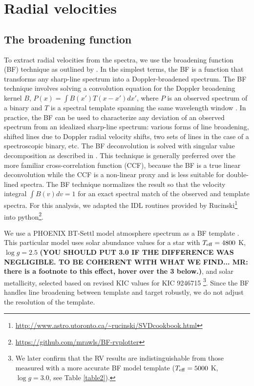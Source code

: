 \section{Radial velocities}\label{rvs}
\subsection{The broadening function}\label{bf}
To extract radial velocities from the spectra, we use the broadening function (BF) technique as outlined by \citet{ruc02}. In the simplest terms, the BF is a function that transforms any sharp-line spectrum into a Doppler-broadened spectrum. The BF technique involves solving a convolution equation for the Doppler broadening kernel $B$, $P(x) = \int B(x') T(x - x') dx'$, where $P$ is an observed spectrum of a binary and $T$ is a spectral template spanning the same wavelength window \citep{ruc14}. In practice, the BF can be used to characterize any deviation of an observed spectrum from an idealized sharp-line spectrum: various forms of line broadening, shifted lines due to Doppler radial velocity shifts, two sets of lines in the case of a spectroscopic binary, etc. The BF deconvolution is solved with singular value decomposition as described in \citet{ruc02}. This technique is generally preferred over the more familiar cross-correlation function (CCF), because the BF is a true linear deconvolution while the CCF is a non-linear proxy and is less suitable for double-lined spectra. The BF technique normalizes the result so that the velocity integral $\int B(v) dv = 1$ for an exact spectral match of the observed and template spectra. For this analysis, we adapted the IDL routines provided by Rucinski\footnote{\url{http://www.astro.utoronto.ca/~rucinski/SVDcookbook.html}} into python\footnote{\url{https://github.com/mrawls/BF-rvplotter}}.

We use a PHOENIX BT-Settl model atmosphere spectrum as a BF template \citep{all03}. This particular model uses \citet{asp09} solar abundance values for a star with $T_{\rm{eff}} = 4800$ K, $\log g = 2.5$ {\bf{(YOU SHOULD PUT 3.0 IF THE DIFFERENCE WAS NEGLIGIBLE. TO BE COHERENT WITH WHAT WE FIND... MR: there is a footnote to this effect, hover over the 3 below.)}}, and solar metallicity, selected based on revised KIC values for KIC 9246715 \citep{hub14.2}\footnote{We later confirm that the RV results are indistinguishable from those measured with a more accurate BF model template ($T_{\rm{eff}} = 5000$ K, $\log g = 3.0$, see Table \ref{table2}).}. Since the BF handles line broadening between template and target robustly, we do not adjust the resolution of the template.

